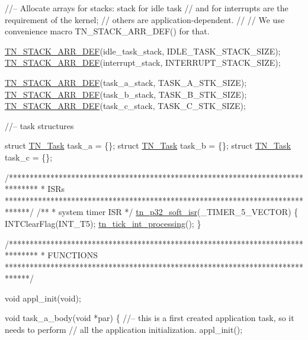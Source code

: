 \begin{DoxyCodeInclude}
\textcolor{comment}{//-- Allocate arrays for stacks: stack for idle task}
\textcolor{comment}{//   and for interrupts are the requirement of the kernel;}
\textcolor{comment}{//   others are application-dependent.}
\textcolor{comment}{//}
\textcolor{comment}{//   We use convenience macro TN\_STACK\_ARR\_DEF() for that.}

\hyperlink{tn__sys_8h_ad61af0f0e9ab96bdf1ac1bf1e03e3c75}{TN\_STACK\_ARR\_DEF}(idle\_task\_stack, IDLE\_TASK\_STACK\_SIZE);
\hyperlink{tn__sys_8h_ad61af0f0e9ab96bdf1ac1bf1e03e3c75}{TN\_STACK\_ARR\_DEF}(interrupt\_stack, INTERRUPT\_STACK\_SIZE);

\hyperlink{tn__sys_8h_ad61af0f0e9ab96bdf1ac1bf1e03e3c75}{TN\_STACK\_ARR\_DEF}(task\_a\_stack, TASK\_A\_STK\_SIZE);
\hyperlink{tn__sys_8h_ad61af0f0e9ab96bdf1ac1bf1e03e3c75}{TN\_STACK\_ARR\_DEF}(task\_b\_stack, TASK\_B\_STK\_SIZE);
\hyperlink{tn__sys_8h_ad61af0f0e9ab96bdf1ac1bf1e03e3c75}{TN\_STACK\_ARR\_DEF}(task\_c\_stack, TASK\_C\_STK\_SIZE);



\textcolor{comment}{//-- task structures}

\textcolor{keyword}{struct }\hyperlink{structTN__Task}{TN\_Task} task\_a = \{\};
\textcolor{keyword}{struct }\hyperlink{structTN__Task}{TN\_Task} task\_b = \{\};
\textcolor{keyword}{struct }\hyperlink{structTN__Task}{TN\_Task} task\_c = \{\};



\textcolor{comment}{/*******************************************************************************}
\textcolor{comment}{ *    ISRs}
\textcolor{comment}{ ******************************************************************************/}
\textcolor{comment}{}
\textcolor{comment}{/**}
\textcolor{comment}{ * system timer ISR}
\textcolor{comment}{ */}
\hyperlink{tn__arch__pic32_8h_a02d853d8d573f928fb8da65ef0c2bc8e}{tn\_p32\_soft\_isr}(\_TIMER\_5\_VECTOR)
\{
   INTClearFlag(INT\_T5);
   \hyperlink{tn__sys_8h_aa44d297639e0520420890ef2bb7e2c1c}{tn\_tick\_int\_processing}();
\}



\textcolor{comment}{/*******************************************************************************}
\textcolor{comment}{ *    FUNCTIONS}
\textcolor{comment}{ ******************************************************************************/}

\textcolor{keywordtype}{void} appl\_init(\textcolor{keywordtype}{void});

\textcolor{keywordtype}{void} task\_a\_body(\textcolor{keywordtype}{void} *par)
\{
   \textcolor{comment}{//-- this is a first created application task, so it needs to perform}
   \textcolor{comment}{//   all the application initialization.}
   appl\_init();


\end{DoxyCodeInclude}
